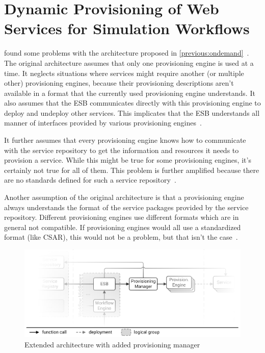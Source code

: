 \section{Dynamic Provisioning of Web Services for Simulation Workflows}
\label{previous:dynamic}

\citeauthor*{provisioning:dynamic} found some problems with the architecture proposed in \autoref{previous:ondemand}~\autocite{provisioning:dynamic}.
The original architecture assumes that only one provisioning engine is used at a time.
It neglects situations where services might require another (or multiple other) provisioning engines, because their provisioning descriptions aren't available in a format that the currently used provisioning engine understands.
It also assumes that the ESB communicates directly with this provisioning engine to deploy and undeploy other services.
This implicates that the ESB understands all manner of interfaces provided by various provisioning engines~\autocite{provisioning:dynamic}.

It further assumes that every provisioning engine knows how to communicate with the service repository to get the information and resources it needs to provision a service.
While this might be true for some provisioning engines, it's certainly not true for all of them.
This problem is further amplified because there are no standards defined for such a service repository~\autocite{provisioning:dynamic}.

Another assumption of the original architecture is that a provisioning engine always understands the format of the service packages provided by the service repository.
Different provisioning engines use different formats which are in general not compatible.
If provisioning engines would all use a standardized format (like CSAR), this would not be a problem, but that isn't the case~\autocite{provisioning:dynamic}.

\begin{figure}[!htbp]
	\centering
	\includegraphics[resolution=600]{previous/assets/valeri_architecture}
	\caption{Extended architecture with added provisioning manager~\autocite[based on][]{serviceselection}}
	\label{image:valeri_architecture}
\end{figure}

